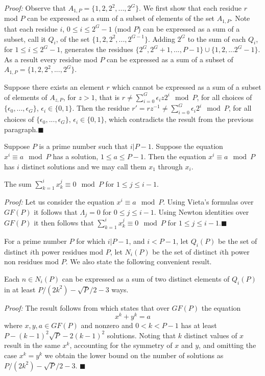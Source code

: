 \noindent \textit{Proof:} Observe that
$A_{1,P}=\{1,2,2^2,...,2^{G}\}$. We first show that each residue
$r$ mod $P$ can be expressed as a sum of a subset of elements of
the set $A_{1,P}$. Note that each residue $i$, $0 \leq i \leq
2^G-1$ (mod $P$) can be expressed as a sum of a subset, call it
$Q_i$, of the set $\{1,2,2^2,...,2^{G-1}\}$. Adding $2^G$ to the
sum of each $Q_i$, for $1 \leq i \leq 2^G-1$, generates the
residues $\{2^G, 2^G+1,...,P-1 \}\cup \{1,2,...2^G-1\}$. As a
result every residue mod $P$ can be expressed as a sum of a subset
of $A_{1,P}=\{1,2,2^2,...,2^{G}\}$.

Suppose there exists an element $r$ which cannot be expressed as a
sum of a subset of elements of $A_{z,P}$, for $z>1$, that is $r
\neq \sum_{i=0}^G \epsilon_i z 2^i \mod P$, for all choices of
$\{\epsilon_0,...,\epsilon_G\}$, $\epsilon_i \in \{0,1\}$. Then
the residue $r' = rz^{-1} \neq \sum_{i=0}^G \epsilon_i 2^i \mod
P$, for all choices of $\{\epsilon_0,...,\epsilon_G\}$,
$\epsilon_i \in \{0,1\}$, which contradicts the result from the
previous paragraph.\hfill$\blacksquare$

Suppose $P$ is a prime number such that $i|P-1$. Suppose the
equation $x^i\equiv a \mod P$ has a solution, $1 \leq a \leq P-1$.
Then the equation $x^i\equiv a \mod P$ has $i$ distinct solutions
\cite{apostol} and we may call them $x_1$ through $x_i$.
\begin{lemma}\label{sums}
The sum $\sum_{k=1}^i x_k^j \equiv 0 \mod P$ for $1 \leq j \leq
i-1$.
\end{lemma}
\noindent \textit{Proof:} Let us consider the equation $x^i \equiv
a \mod P$. Using Vieta's formulas over $GF(P)$ it follows that
$\Lambda_{j}=0$ for $0 \leq j \leq i-1$. Using Newton identities
over $GF(P)$ it then follows that
 $\sum_{k=1}^i x_k^j \equiv 0 \mod P$ for $1 \leq j \leq
i-1$.\hfill$\blacksquare$

For a prime number $P$ for which $i|P-1$, and $i<P-1$, let
$Q_i(P)$ be the set of distinct $i$th power residues mod $P$, let
$N_i(P)$ be the set of distinct $i$th power non residues mod $P$.
We also state the following convenient result.
\begin{lemma}\label{main}
Each $n \in N_i(P)$ can be expressed as a sum of two distinct
elements of $Q_i(P)$ in at least $P/(2k^2)-\sqrt{P}/2-3$ ways.
\end{lemma}
\noindent \textit{Proof:} The result follows from \cite{huavan:49}
which states that over $GF(P)$ the equation
\begin{equation}\label{hua} x^k+y^k=a
\end{equation} where $x,y,a \in GF(P)$ and nonzero and $0 < k <P-1 $
has at least $P-(k-1)^2\sqrt{P}-2(k-1)^2$ solutions. Noting that
$k$ distinct values of $x$ result in the same $x^k$, accounting
for the symmetry of $x$ and $y$, and omitting the case $x^k=y^k$
we obtain the lower bound on the number of solutions as
$P/(2k^2)-\sqrt{P}/2-3$. \hfill$\blacksquare$

